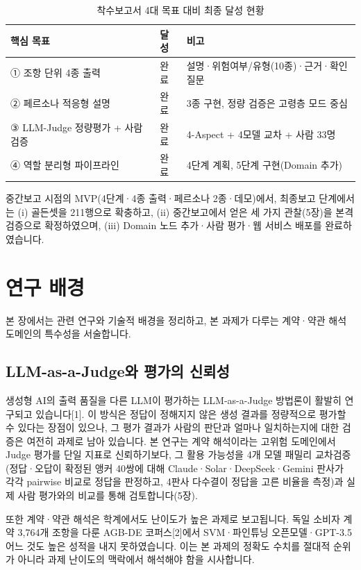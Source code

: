 \documentclass[10pt,a4paper]{article}
\newcommand{\tsz}{\fontsize{9.2}{12}\selectfont}
\begin{document}
\begin{table}[!htbp]\centering\tsz
\caption{착수보고서 4대 목표 대비 최종 달성 현황}\label{tab:goals}
\begin{tabularx}{0.9\textwidth}{L{5.2cm} L{1.2cm} Y}
\toprule
\textbf{핵심 목표} & \textbf{달성} & \textbf{비고}\\
\midrule
① 조항 단위 4종 출력 & 완료 & 설명·위험여부/유형(10종)·근거·확인질문\\
② 페르소나 적응형 설명 & 완료 & 3종 구현, 정량 검증은 고령층 모드 중심\\
③ LLM-Judge 정량평가 + 사람 검증 & 완료 & 4-Aspect + 4모델 교차 + 사람 33명\\
④ 역할 분리형 파이프라인 & 완료 & 4단계 계획, 5단계 구현(Domain 추가)\\
\bottomrule
\end{tabularx}
\end{table}

중간보고 시점의 MVP(4단계·4종 출력·페르소나 2종·데모)에서, 최종보고 단계에서는 (i) 골든셋을 211행으로 확충하고, (ii) 중간보고에서 얻은 세 가지 관찰(5장)을 본격 검증으로 확정하였으며, (iii) Domain 노드 추가·사람 평가·웹 서비스 배포를 완료하였습니다.

\section{연구 배경}
본 장에서는 관련 연구와 기술적 배경을 정리하고, 본 과제가 다루는 계약·약관 해석 도메인의 특수성을 서술합니다.

\subsection{LLM-as-a-Judge와 평가의 신뢰성}
생성형 AI의 출력 품질을 다른 LLM이 평가하는 LLM-as-a-Judge 방법론이 활발히 연구되고 있습니다[1]. 이 방식은 정답이 정해지지 않은 생성 결과를 정량적으로 평가할 수 있다는 장점이 있으나, 그 평가 결과가 사람의 판단과 얼마나 일치하는지에 대한 검증은 여전히 과제로 남아 있습니다. 본 연구는 계약 해석이라는 고위험 도메인에서 Judge 평가를 단일 지표로 신뢰하기보다, 그 활용 가능성을 4개 모델 패밀리 교차검증(정답·오답이 확정된 앵커 40쌍에 대해 Claude·Solar·DeepSeek·Gemini 판사가 각각 pairwise 비교로 정답을 판정하고, 4판사 다수결이 정답을 고른 비율을 측정)과 실제 사람 평가와의 비교를 통해 검토합니다(5장).

또한 계약·약관 해석은 학계에서도 난이도가 높은 과제로 보고됩니다. 독일 소비자 계약 3,764개 조항을 다룬 AGB-DE 코퍼스[2]에서 SVM·파인튜닝 오픈모델·GPT-3.5 어느 것도 높은 성적을 내지 못하였습니다. 이는 본 과제의 정확도 수치를 절대적 순위가 아니라 과제 난이도의 맥락에서 해석해야 함을 시사합니다.
\end{document}

